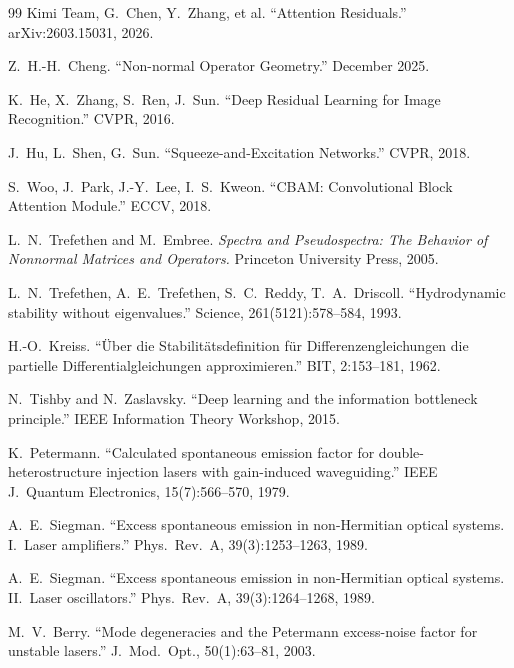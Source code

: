 \documentclass[11pt,a4paper]{article}
\theoremstyle{definition}
\begin{document}
\begin{thebibliography}{99}
    Kimi Team, G.~Chen, Y.~Zhang, et al.
    ``Attention Residuals.''
    arXiv:2603.15031, 2026.

    Z.~H.-H.~Cheng.
    ``Non-normal Operator Geometry.''
    December 2025.

    K.~He, X.~Zhang, S.~Ren, J.~Sun.
    ``Deep Residual Learning for Image Recognition.''
    CVPR, 2016.

    J.~Hu, L.~Shen, G.~Sun.
    ``Squeeze-and-Excitation Networks.''
    CVPR, 2018.

    S.~Woo, J.~Park, J.-Y.~Lee, I.~S.~Kweon.
    ``CBAM: Convolutional Block Attention Module.''
    ECCV, 2018.

    L.~N.~Trefethen and M.~Embree.
    \emph{Spectra and Pseudospectra: The Behavior of Nonnormal Matrices
    and Operators.}
    Princeton University Press, 2005.

    L.~N.~Trefethen, A.~E.~Trefethen, S.~C.~Reddy, T.~A.~Driscoll.
    ``Hydrodynamic stability without eigenvalues.''
    Science, 261(5121):578--584, 1993.

    H.-O.~Kreiss.
    ``\"Uber die Stabilit\"atsdefinition f\"ur Differenzengleichungen
    die partielle Differentialgleichungen approximieren.''
    BIT, 2:153--181, 1962.

    N.~Tishby and N.~Zaslavsky.
    ``Deep learning and the information bottleneck principle.''
    IEEE Information Theory Workshop, 2015.

    K.~Petermann.
    ``Calculated spontaneous emission factor for double-heterostructure
    injection lasers with gain-induced waveguiding.''
    IEEE J.\ Quantum Electronics, 15(7):566--570, 1979.

    A.~E.~Siegman.
    ``Excess spontaneous emission in non-Hermitian optical systems.
    I.\ Laser amplifiers.''
    Phys.\ Rev.\ A, 39(3):1253--1263, 1989.

    A.~E.~Siegman.
    ``Excess spontaneous emission in non-Hermitian optical systems.
    II.\ Laser oscillators.''
    Phys.\ Rev.\ A, 39(3):1264--1268, 1989.

    M.~V.~Berry.
    ``Mode degeneracies and the Petermann excess-noise factor for
    unstable lasers.''
    J.\ Mod.\ Opt., 50(1):63--81, 2003.


\end{thebibliography}
\end{document}
